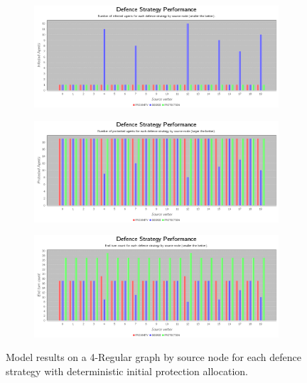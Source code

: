 \documentclass[results.tex]{subfiles}
\begin{document}
\newpage

\begin{figure}[!ht]
\centering
     \begin{subfigure}[b]{0.9\textwidth}
         \centering
         \includegraphics[width=\textwidth]{Deterministic/DeterministicInfectedChart}
         \label{fig:4reg-det-infected}
     \end{subfigure}
     \vfill
     \begin{subfigure}[b]{0.9\textwidth}
         \centering
         \includegraphics[width=\textwidth]{Deterministic/DeterministicProtectedChart}
         \label{fig:4reg-det-protected}
     \end{subfigure}
     \vfill
     \begin{subfigure}[b]{0.9\textwidth}
         \centering
         \includegraphics[width=\textwidth]{Deterministic/DeterministicEndTurnChart}
         \label{fig:4reg-det-end}
     \end{subfigure}
        \caption{Model results on a 4-Regular graph by source node for each defence strategy with deterministic initial protection allocation.}
        \label{fig:4reg-det-charts}
\end{figure}
\end{document}
